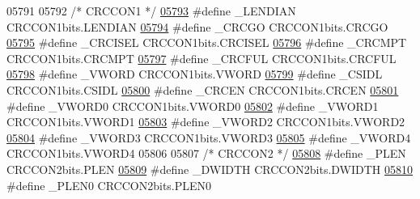 \begin{DoxyCode}
05791 
05792 \textcolor{comment}{/* CRCCON1 */}
\hypertarget{a00015_source_l05793}{}\hyperlink{a00015_aee8a8e644275f749e5b0c82fdf6385d1}{05793} \textcolor{preprocessor}{#define \_LENDIAN CRCCON1bits.LENDIAN}
\hypertarget{a00015_source_l05794}{}\hyperlink{a00015_a1cbd32a5ce8d13820490ade35fffaca3}{05794} \textcolor{preprocessor}{#define \_CRCGO CRCCON1bits.CRCGO}
\hypertarget{a00015_source_l05795}{}\hyperlink{a00015_ae410889a7f2f1cfa088622558f2c8b8c}{05795} \textcolor{preprocessor}{#define \_CRCISEL CRCCON1bits.CRCISEL}
\hypertarget{a00015_source_l05796}{}\hyperlink{a00015_ad4c77fc9608f056374cfbd2ce8fe46cb}{05796} \textcolor{preprocessor}{#define \_CRCMPT CRCCON1bits.CRCMPT}
\hypertarget{a00015_source_l05797}{}\hyperlink{a00015_aa9619f82c4681d374639604a08b376bf}{05797} \textcolor{preprocessor}{#define \_CRCFUL CRCCON1bits.CRCFUL}
\hypertarget{a00015_source_l05798}{}\hyperlink{a00015_a97e0fea316e02578044d9e912fb810af}{05798} \textcolor{preprocessor}{#define \_VWORD CRCCON1bits.VWORD}
\hypertarget{a00015_source_l05799}{}\hyperlink{a00015_aba7108ceb66b0a4ce56c867ce5beca7c}{05799} \textcolor{preprocessor}{#define \_CSIDL CRCCON1bits.CSIDL}
\hypertarget{a00015_source_l05800}{}\hyperlink{a00015_aeead4c5f75df89e784bbb15d51a501ed}{05800} \textcolor{preprocessor}{#define \_CRCEN CRCCON1bits.CRCEN}
\hypertarget{a00015_source_l05801}{}\hyperlink{a00015_a2a8ea8a9913005380bd3e8637671bd0b}{05801} \textcolor{preprocessor}{#define \_VWORD0 CRCCON1bits.VWORD0}
\hypertarget{a00015_source_l05802}{}\hyperlink{a00015_a07745c1266d6d046ff201fd46df841d5}{05802} \textcolor{preprocessor}{#define \_VWORD1 CRCCON1bits.VWORD1}
\hypertarget{a00015_source_l05803}{}\hyperlink{a00015_a80f6ba35197ea8cae8db688d6fc07a25}{05803} \textcolor{preprocessor}{#define \_VWORD2 CRCCON1bits.VWORD2}
\hypertarget{a00015_source_l05804}{}\hyperlink{a00015_adbeb6be88381ca90caa245795c62304d}{05804} \textcolor{preprocessor}{#define \_VWORD3 CRCCON1bits.VWORD3}
\hypertarget{a00015_source_l05805}{}\hyperlink{a00015_a1dc962599f56cd4618c771d9fad62102}{05805} \textcolor{preprocessor}{#define \_VWORD4 CRCCON1bits.VWORD4}
05806 
05807 \textcolor{comment}{/* CRCCON2 */}
\hypertarget{a00015_source_l05808}{}\hyperlink{a00015_ad5a9a36942e19de91dbe24742b143276}{05808} \textcolor{preprocessor}{#define \_PLEN CRCCON2bits.PLEN}
\hypertarget{a00015_source_l05809}{}\hyperlink{a00015_aba4efb6c95893d78cc49999bcbc109ed}{05809} \textcolor{preprocessor}{#define \_DWIDTH CRCCON2bits.DWIDTH}
\hypertarget{a00015_source_l05810}{}\hyperlink{a00015_a14e19edb3c3567cf4e2ae7921e88c6e3}{05810} \textcolor{preprocessor}{#define \_PLEN0 CRCCON2bits.PLEN0}

\end{DoxyCode}
